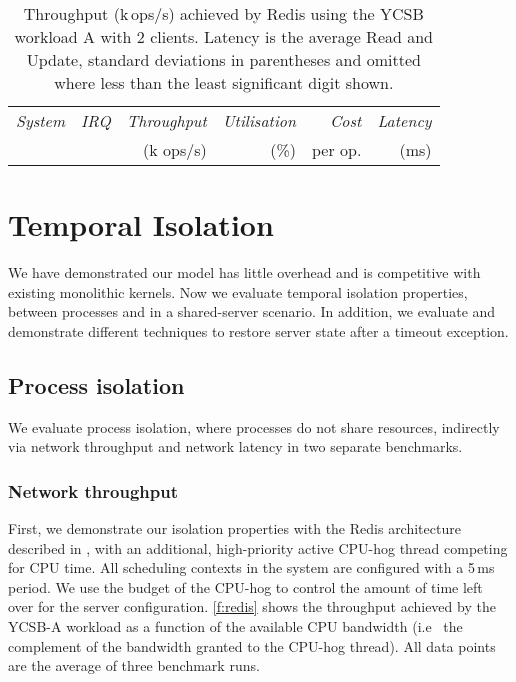 \begin{table}[t]\centering
      \begin{tabularx}{\textwidth}{Xrrrrr}\toprule
          \emph{System}   & \emph{IRQ} & \emph{Throughput} & \emph{Utilisation} & \emph{Cost} & \emph{Latency} \\
                          &            & (k ops/s)         & (\%)               & per op.     & (ms)            \\
        \midrule

      
      \bottomrule
    \end{tabularx}
    \caption[Results of Redis throughput benchmark.]{Throughput (k\,ops/s) achieved by Redis using the YCSB
      workload A with 2 clients.  Latency is the average Read and Update,
      standard deviations in parentheses and omitted where less than the least
      significant digit shown.}
    \label{t:redis}
\end{table}

\section{Temporal Isolation}

We have demonstrated our model has little overhead and is competitive with existing monolithic
kernels. Now we evaluate temporal isolation properties, between processes and in a shared-server
scenario. 
In addition, we evaluate and demonstrate different
techniques to restore server state after a timeout exception.

\subsection{Process isolation} 

We evaluate process isolation, where processes do not share resources, indirectly via network
throughput and network latency in two separate benchmarks. 
\subsubsection{Network throughput}

First, we demonstrate our isolation properties with the Redis architecture described in
, with an additional, high-priority active CPU-hog thread
competing for \gls{CPU} time.  All scheduling contexts in the system are configured with a
5\,ms period. We use the budget of the CPU-hog to control the amount of time left over
for the server configuration. \autoref{f:redis} shows the throughput
achieved by the YCSB-A workload as a function of the available CPU
bandwidth (i.e \ the complement of the bandwidth granted to the CPU-hog
thread). All data points are the average of three benchmark runs.

